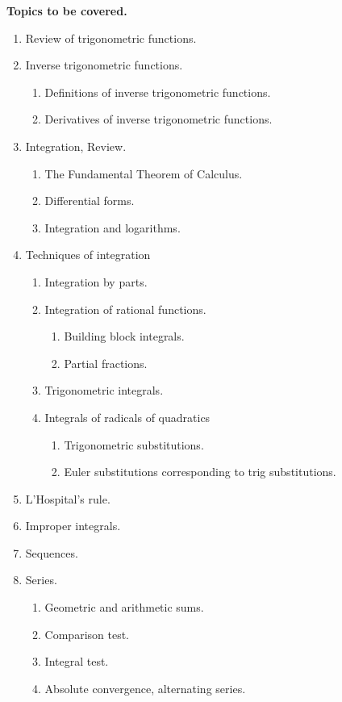 \documentclass{article}
\begin{document}
\medskip
\noindent \textbf{Topics to be covered.} 
\renewcommand{\theenumii}{\arabic{enumii}}
\begin{enumerate}
\item Review of trigonometric functions.
\item Inverse trigonometric functions.
\begin{enumerate}
\item Definitions of inverse trigonometric functions.
\item Derivatives of inverse trigonometric functions.
\end{enumerate}
\item Integration, Review.
\begin{enumerate}
\item The Fundamental Theorem of Calculus.
\item Differential forms.
\item Integration and logarithms.
\end{enumerate}
\item Techniques of integration
\begin{enumerate}
\item Integration by parts.
\item Integration of rational functions.
\begin{enumerate}
\item Building block integrals.
\item Partial fractions.
\end{enumerate}
\item Trigonometric integrals.
\item Integrals of radicals of quadratics
\begin{enumerate}
\item Trigonometric substitutions.
\item Euler substitutions corresponding to trig substitutions.
\end{enumerate}
\end{enumerate}
\item L'Hospital's rule.
\item Improper integrals.
\item Sequences.
\item Series.
\begin{enumerate}
\item Geometric and arithmetic sums.
\item Comparison test.
\item Integral test.
\item Absolute convergence, alternating series.

\end{enumerate}
\end{enumerate}
\end{document}
